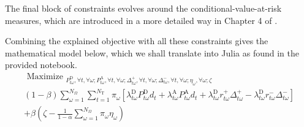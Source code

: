 The final block of constraints evolves around the conditional-value-at-risk measures, which are introduced in a more detailed way in Chapter 4 of \cite{Conejo10}.

Combining the explained objective with all these constraints gives the mathematical model below, which we shall translate into Julia as found in the provided notebook.  
\begin{equation}
\begin{array}{c}
\text { Maximize }_{P_{t \omega}^{\mathrm{D}}, \forall t, \forall \omega ; P_{t \omega}^{\mathrm{A}}, \forall t, \forall \omega ; \Delta_{t \omega}^{+}, \forall t, \forall \omega ; \Delta_{t \omega}^{-}, \forall t, \forall \omega ; \eta_{\omega}, \forall \omega ; \zeta} \\
(1-\beta)\sum_{\omega=1}^{N_{\Omega}} \sum_{t=1}^{N_{\mathrm{T}}} \pi_{\omega}\left[\lambda_{t \omega}^{\mathrm{D}} P_{t \omega}^{\mathrm{D}} d_{t}+\lambda_{t \omega}^{\mathrm{A}} P_{t \omega}^{\mathrm{A}} d_{t}+\lambda_{t \omega}^{\mathrm{D}} r_{t \omega}^{+} \Delta_{t \omega}^{+}-\lambda_{t \omega}^{\mathrm{D}} r_{t \omega}^{-} \Delta_{t \omega}^{-}\right] 
\\+\beta\left(\zeta-\frac{1}{1-\alpha} \sum_{\omega=1}^{N_{\Omega}} \pi_{\omega} \eta_{\omega}\right)
\end{array}
\end{equation} 
